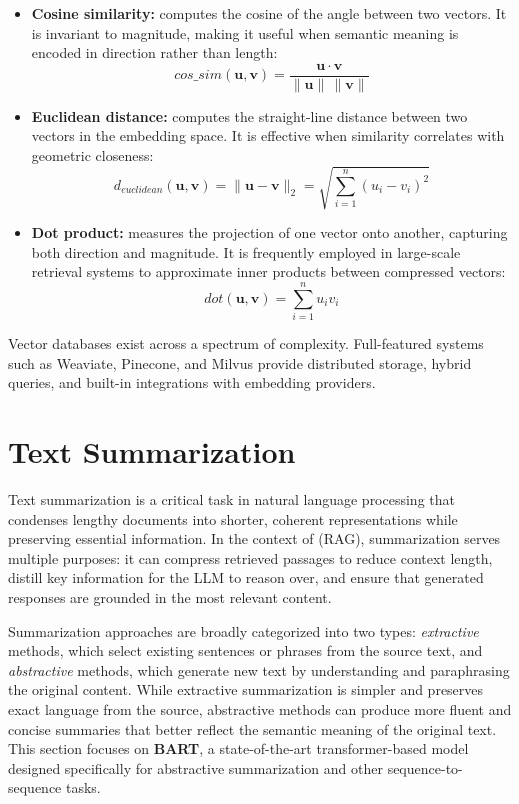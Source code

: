 \begin{itemize}
    \item \textbf{Cosine similarity:} computes the cosine of the angle between two vectors. It is invariant to magnitude, making it useful when semantic meaning is encoded in direction rather than length:  
    \[
        \textit{cos\_sim}(\mathbf{u}, \mathbf{v}) = \frac{\mathbf{u} \cdot \mathbf{v}}{\|\mathbf{u}\| \, \|\mathbf{v}\|}
    \]
    
    \item \textbf{Euclidean distance:} computes the straight-line distance between two vectors in the embedding space. It is effective when similarity correlates with geometric closeness:  
    \[
        d_{\textit{euclidean}}(\mathbf{u}, \mathbf{v}) = \|\mathbf{u} - \mathbf{v}\|_2 = \sqrt{\sum_{i=1}^n (u_i - v_i)^2}
    \]
    
    \item \textbf{Dot product:} measures the projection of one vector onto another, capturing both direction and magnitude. It is frequently employed in large-scale retrieval systems to approximate inner products between compressed vectors:  
    \[
        \textit{dot}(\mathbf{u}, \mathbf{v}) = \sum_{i=1}^n u_i v_i
    \]
\end{itemize}


Vector databases exist across a spectrum of complexity. Full-featured systems such as Weaviate, Pinecone, and Milvus provide distributed storage, hybrid queries, and built-in integrations with embedding providers.


\section{Text Summarization}
\label{sec:text-summarization}

Text summarization is a critical task in natural language processing that condenses lengthy documents into shorter, coherent representations while preserving essential information. In the context of (\gls{RAG}), summarization serves multiple purposes: it can compress retrieved passages to reduce context length, distill key information for the \gls{LLM} to reason over, and ensure that generated responses are grounded in the most relevant content.

Summarization approaches are broadly categorized into two types: \textit{extractive} methods, which select existing sentences or phrases from the source text, and \textit{abstractive} methods, which generate new text by understanding and paraphrasing the original content. While extractive summarization is simpler and preserves exact language from the source, abstractive methods can produce more fluent and concise summaries that better reflect the semantic meaning of the original text. This section focuses on \textbf{\gls{BART}}, a state-of-the-art transformer-based model designed specifically for abstractive summarization and other sequence-to-sequence tasks.

